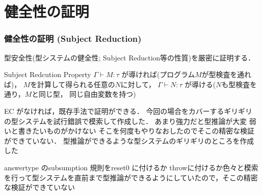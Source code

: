 


\section{健全性の証明}

\begin{frame}[fragile]
  \frametitle{健全性の証明 (Subject Reduction)}

  型安全性(型システムの健全性; Subject Reduction等の性質)を厳密に証明する．

  \begin{block}{Subject Redcution Property}
    $\Gamma \vdash M: \tau$ が導ければ(プログラム$M$が型検査を通れば)，
    $M$を計算して得られる任意の$N$に対して，
    $\Gamma \vdash N: \tau$ が導ける($N$も型検査を通り，$M$と同じ型，
    同じ自由変数を持つ)
  \end{block}

  EC がなければ，既存手法で証明ができる．
  今回の場合をカバーするギリギリの型システムを試行錯誤で模索して作成した．
  あまり強力だと型推論が大変
  弱いと書きたいものがかけない
  そこを何度もやりなおしたのでそこの精密な検証ができていない．
  型推論ができるような型システムのギリギリのところを作成した

  answertype のsubsumption 規則をreset0 に付けるか throwに付けるか色々と模索を行って型システムを直前まで型推論ができるようにしていたので，そこの精密な検証ができていない
\end{frame}





